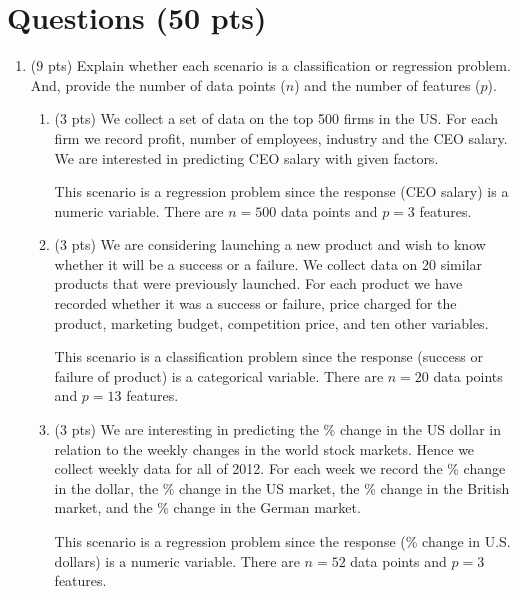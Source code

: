 \documentclass[a4paper]{article}
\theoremstyle{definition}
\newenvironment{soln}{
    \leavevmode\color{blue}\ignorespaces
}{}
\begin{document}
\section{Questions (50 pts)}
\begin{enumerate}
\item (9 pts) Explain whether each scenario is a classification or regression problem. And, provide the number of data points ($n$) and the number of features ($p$).

\begin{enumerate}
	\item (3 pts) We collect a set of data on the top 500 firms in the US. For each firm we record profit, number of employees, industry and the CEO salary. We are interested in predicting CEO salary with given factors.
	
	\begin{soln}  This scenario is a regression problem since the response (CEO salary) is a numeric variable. There are $n = 500$ data points and $p = 3$ features. \end{soln}
	
	\medskip

	\item (3 pts) We are considering launching a new product and wish to know whether it will be a success or a failure. We collect data on 20 similar products that were previously launched. For each product we have recorded whether it was a success or failure, price charged for the product, marketing budget, competition price, and ten other variables.
	
	\begin{soln}  This scenario is a classification problem since the response (success or failure of product) is a categorical variable. There are $n = 20$ data points and $p=13$ features. \end{soln} 
	
	\medskip

	\item (3 pts) We are interesting in predicting the \% change in the US dollar in relation to the weekly changes in the world stock markets. Hence we collect weekly data for all of 2012. For each week we record the \% change in the dollar, the \% change in the US market, the \% change in the British market, and the \% change in the German market.
	
	\begin{soln}  This scenario is a regression problem since the response (\% change in U.S. dollars) is a numeric variable. There are $n=52$ data points and $p=3$ features. \end{soln}
	

\end{enumerate}
\end{enumerate}
\end{document}
